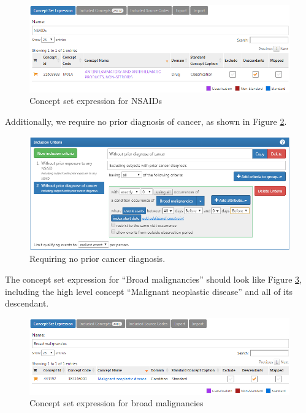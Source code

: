 \documentclass[11pt]{book}
\theoremstyle{definition}
\theoremstyle{definition}
\theoremstyle{definition}
\theoremstyle{remark}
\begin{document}
\begin{figure}

{\centering \includegraphics[width=1\linewidth]{images/SuggestedAnswers/cohortsAtlasConceptSet2} 

}

\caption{Concept set expression for NSAIDs}\label{fig:cohortsAtlasConceptSet2}
\end{figure}

Additionally, we require no prior diagnosis of cancer, as shown in
Figure \ref{fig:cohortsAtlasInclusion2}.

\begin{figure}

{\centering \includegraphics[width=1\linewidth]{images/SuggestedAnswers/cohortsAtlasInclusion2} 

}

\caption{Requiring no prior cancer diagnosis.}\label{fig:cohortsAtlasInclusion2}
\end{figure}

The concept set expression for ``Broad malignancies'' should look like
Figure \ref{fig:cohortsAtlasConceptSet3}, including the high level
concept ``Malignant neoplastic disease'' and all of its descendant.

\begin{figure}

{\centering \includegraphics[width=1\linewidth]{images/SuggestedAnswers/cohortsAtlasConceptSet3} 

}

\caption{Concept set expression for broad malignancies}\label{fig:cohortsAtlasConceptSet3}
\end{figure}
\end{document}
